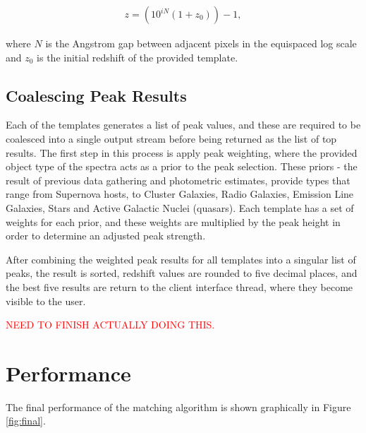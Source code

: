 \documentclass[titlesmallcaps, examinerscopy, copyrightpage]{uqthesis}
\newcommand{\brac}[1]{\left( #1 \right)}
\begin{document}
\begin{align}
z = \brac{10^{iN} (1+z_0)} - 1,
\end{align}

where $N$ is the Angstrom gap between adjacent pixels in the equispaced log scale and $z_0$ is the initial redshift of the provided template.

\subsection{Coalescing Peak Results}

Each of the templates generates a list of peak values, and these are required to be coalesced into a single output stream before being returned as the list of top results. The first step in this process is apply peak weighting, where the provided object type of the spectra acts as a prior to the peak selection. These priors - the result of previous data gathering and photometric estimates, provide types that range from Supernova hosts, to Cluster Galaxies, Radio Galaxies, Emission Line Galaxies, Stars and Active Galactic Nuclei (quasars). Each template has a set of weights for each prior, and these weights are multiplied by the peak height in order to determine an adjusted peak strength.

After combining the weighted peak results for all templates into a singular list of peaks, the result is sorted, redshift values are rounded to five decimal places, and the best five results are return to the client interface thread, where they become visible to the user.

\textcolor{red}{NEED TO FINISH ACTUALLY DOING THIS.}

\section{Performance} \label{sec:performance}

The final performance of the matching algorithm is shown graphically in Figure \ref{fig:final}. 
\end{document}
